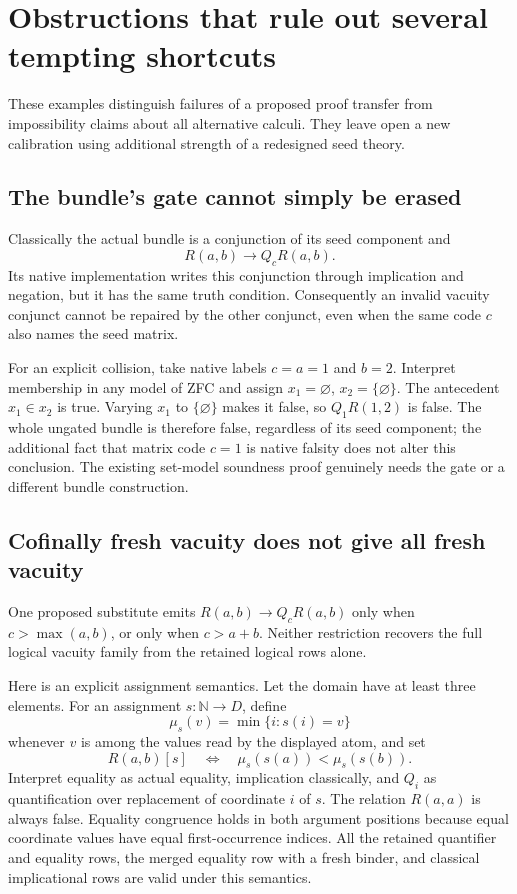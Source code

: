\section{Obstructions that rule out several tempting shortcuts}
\label{sec:logical-obstructions}

These examples distinguish failures of a proposed proof transfer from
impossibility claims about all alternative calculi. They leave open a
new calibration using additional strength of a redesigned seed theory.

\subsection{The bundle's gate cannot simply be erased}

Classically the actual bundle is a conjunction of its seed component
and
\[
 R(a,b)\to Q_cR(a,b).
\]
Its native implementation writes this conjunction through implication
and negation, but it has the same truth condition. Consequently an
invalid vacuity conjunct cannot be repaired by the other conjunct,
even when the same code $c$ also names the seed matrix.

For an explicit collision, take native labels $c=a=1$ and $b=2$.
Interpret membership in any model of ZFC and assign $x_1=\varnothing$,
$x_2=\{\varnothing\}$. The antecedent $x_1\in x_2$ is true. Varying
$x_1$ to $\{\varnothing\}$ makes it false, so
$Q_1R(1,2)$ is false. The whole ungated bundle is therefore false,
regardless of its seed component; the additional fact that matrix code
$c=1$ is native falsity does not alter this conclusion. The existing
set-model soundness proof genuinely needs the gate or a different
bundle construction.

\subsection{Cofinally fresh vacuity does not give all fresh vacuity}

One proposed substitute emits $R(a,b)\to Q_cR(a,b)$ only when
$c>\max(a,b)$, or only when $c>a+b$. Neither restriction recovers the
full logical vacuity family from the retained logical rows alone.

Here is an explicit assignment semantics. Let the domain have at least
three elements. For an assignment $s:\mathbb N\to D$, define
\[
 \mu_s(v)=\min\{i:s(i)=v\}
\]
whenever $v$ is among the values read by the displayed atom, and set
\[
 R(a,b)[s]\quad\Longleftrightarrow\quad
 \mu_s(s(a))<\mu_s(s(b)).
\]
Interpret equality as actual equality, implication classically, and
$Q_i$ as quantification over replacement of coordinate $i$ of $s$.
The relation $R(a,a)$ is always false. Equality congruence holds in
both argument positions because equal coordinate values have equal
first-occurrence indices. All the retained quantifier and equality
rows, the merged equality row with a fresh binder, and classical
implicational rows are valid under this semantics.

